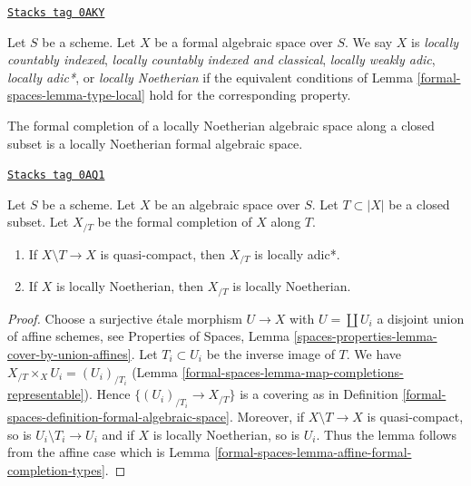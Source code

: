 \begin{definition}
\label{formal-spaces-definition-types-formal-algebraic-spaces}
\href{https://stacks.math.columbia.edu/tag/0AKY}{\texttt{Stacks tag 0AKY}}

Let $S$ be a scheme. Let $X$ be a formal algebraic space over $S$.
We say $X$ is
{\it locally countably indexed},
{\it locally countably indexed and classical},
{\it locally weakly adic},
{\it locally adic*}, or
{\it locally Noetherian}
if the equivalent conditions of Lemma \ref{formal-spaces-lemma-type-local}
hold for the corresponding property.
\end{definition}

The formal completion of a locally Noetherian algebraic space
along a closed subset is a locally Noetherian formal algebraic space.

\begin{lemma}
\label{formal-spaces-lemma-formal-completion-types}
\href{https://stacks.math.columbia.edu/tag/0AQ1}{\texttt{Stacks tag 0AQ1}}

Let $S$ be a scheme. Let $X$ be an algebraic space over $S$.
Let $T \subset |X|$ be a closed subset. Let $X_{/T}$ be the
formal completion of $X$ along $T$.
\begin{enumerate}
\item If $X \setminus T \to X$ is quasi-compact,
then $X_{/T}$ is locally adic*.
\item If $X$ is locally Noetherian, then $X_{/T}$ is locally
Noetherian.
\end{enumerate}
\end{lemma}

\begin{proof}
Choose a surjective \'etale morphism $U \to X$ with $U = \coprod U_i$
a disjoint union of affine schemes, see Properties of Spaces, Lemma
\ref{spaces-properties-lemma-cover-by-union-affines}.
Let $T_i \subset U_i$ be the inverse image of $T$.
We have $X_{/T} \times_X U_i = (U_i)_{/T_i}$
(Lemma \ref{formal-spaces-lemma-map-completions-representable}).
Hence $\{(U_i)_{/T_i} \to X_{/T}\}$ is a covering as in
Definition \ref{formal-spaces-definition-formal-algebraic-space}.
Moreover, if $X \setminus T \to X$ is quasi-compact, so is
$U_i \setminus T_i \to U_i$ and if $X$ is locally Noetherian, so is
$U_i$. Thus the lemma follows from the affine case which is
Lemma \ref{formal-spaces-lemma-affine-formal-completion-types}.
\end{proof}


